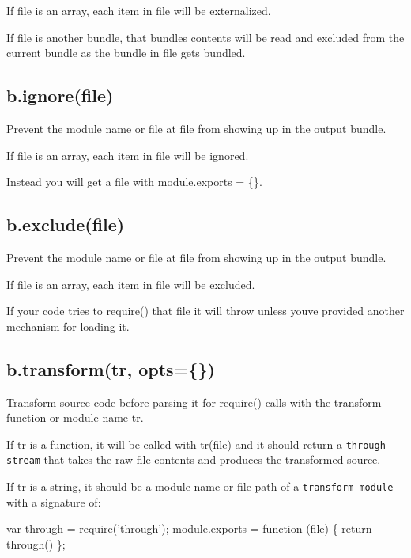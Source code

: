 If {\ttfamily file} is an array, each item in {\ttfamily file} will be externalized.

If {\ttfamily file} is another bundle, that bundle\textquotesingle{}s contents will be read and excluded from the current bundle as the bundle in {\ttfamily file} gets bundled.

\subsection*{b.\+ignore(file)}

Prevent the module name or file at {\ttfamily file} from showing up in the output bundle.

If {\ttfamily file} is an array, each item in {\ttfamily file} will be ignored.

Instead you will get a file with {\ttfamily module.\+exports = \{\}}.

\subsection*{b.\+exclude(file)}

Prevent the module name or file at {\ttfamily file} from showing up in the output bundle.

If {\ttfamily file} is an array, each item in {\ttfamily file} will be excluded.

If your code tries to {\ttfamily require()} that file it will throw unless you\textquotesingle{}ve provided another mechanism for loading it.

\subsection*{b.\+transform(tr, opts=\{\})}

Transform source code before parsing it for {\ttfamily require()} calls with the transform function or module name {\ttfamily tr}.

If {\ttfamily tr} is a function, it will be called with {\ttfamily tr(file)} and it should return a \href{https://github.com/substack/stream-handbook#through}{\tt through-\/stream} that takes the raw file contents and produces the transformed source.

If {\ttfamily tr} is a string, it should be a module name or file path of a \href{https://github.com/browserify/module-deps#transforms}{\tt transform module} with a signature of\+:


\begin{DoxyCode}
var through = require('through');
module.exports = function (file) \{ return through() \};
\end{DoxyCode}


